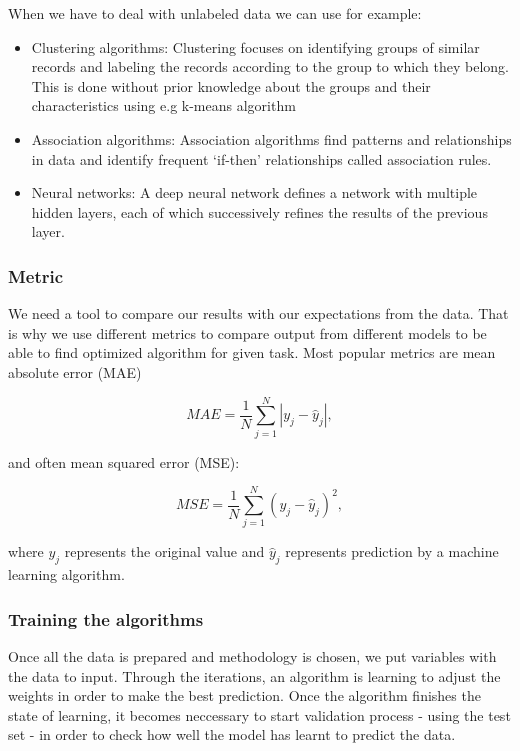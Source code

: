 \documentclass[a4paper,oneside,openright,11pt]{book}
\begin{document}
When we have to deal with unlabeled data we can use for example:

\begin{itemize}
    \item Clustering algorithms: Clustering focuses on identifying groups of similar records and labeling the records according to the group to which they belong. This is done without prior knowledge about the groups and their characteristics using e.g k-means algorithm
    \item Association algorithms: Association algorithms find patterns and relationships in data and identify frequent ‘if-then’ relationships called association rules.
    \item Neural networks: A deep neural network defines a network with multiple hidden layers, each of which successively refines the results of the previous layer. 
\end{itemize}

\subsubsection{Metric}

We need a tool to compare our results with our expectations from the data. That is why we use different metrics to compare output from different models to be able to find optimized algorithm for given task. Most popular metrics are mean absolute error (MAE)

\begin{equation}
    MAE = \frac{1}{N}\sum_{j=1}^{N}|y_{j} - \hat{y}_{j}|,
\end{equation}

and often mean squared error (MSE):


\begin{equation}
    MSE = \frac{1}{N}\sum_{j=1}^{N}(y_{j} - \hat{y}_{j})^{2},
\end{equation}


\noindent
where $y_j$ represents the original value and $\hat{y}_j$ represents prediction by a machine learning algorithm.


\subsubsection{Training the algorithms}

Once all the data is prepared and methodology is chosen, we put variables with the data to input. Through the iterations, an algorithm is learning to adjust the weights in order to make the best prediction. Once the algorithm finishes the state of learning, it becomes neccessary to start validation process - using the test set - in order to check how well the model has learnt to predict the data.
\end{document}
